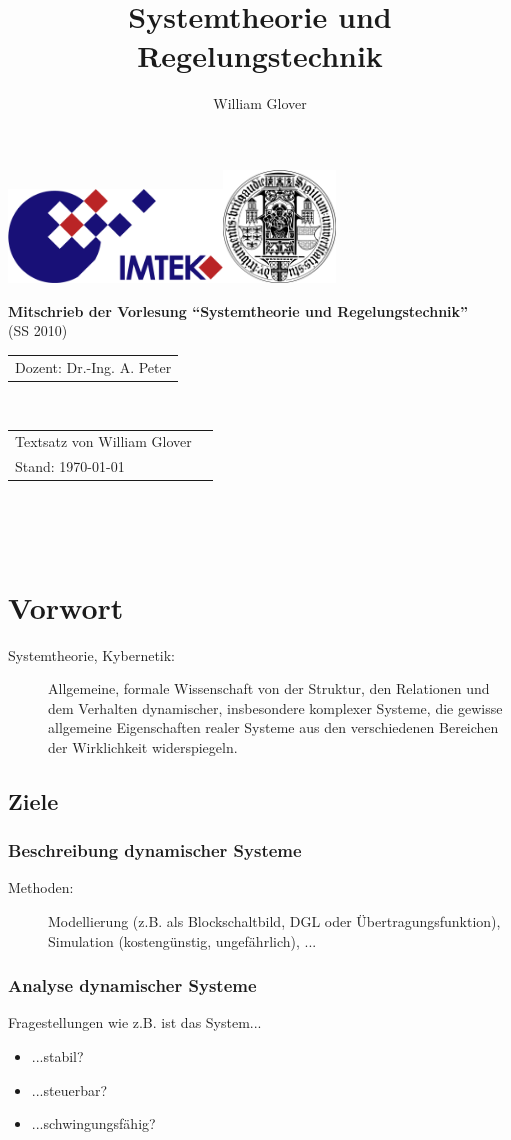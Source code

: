 \documentclass[12pt,a4paper,ngerman]{scrartcl}
\author{William Glover}
\title{Systemtheorie und Regelungstechnik}
\renewcommand\maketitle{
    \begin{titlepage}
        \sffamily
        \thispagestyle{empty}
              \includegraphics[height=2.5cm]{IMTEK_Logo_Farbe}\hfill\includegraphics[height=3cm]{Uni_Siegel}
        \par
        \vspace{2cm}
        \begin{center}
            \Huge \textbf{Mitschrieb der Vorlesung ``Systemtheorie und Regelungstechnik''}\\
            (SS 2010)\\[6cm]
            \end{center}
           

            \begin{tabular}{l}
                \large Dozent: Dr.-Ing. A. Peter\\
         \end{tabular}
         \\
						\begin{tabular}{ll}
                \large Textsatz von William Glover \\
                \large Stand: \today
            \end{tabular}
        
        

 			 \newpage 
       \thispagestyle{empty}~
       \newpage

 
\end{titlepage}
}
\renewcommand{\baselinestretch}{1.5} %
\begin{document}
\maketitle %
\clearpage %
\renewcommand{\baselinestretch}{1.5} %
\thispagestyle{empty} %

\tableofcontents %
\newpage 

        
        \thispagestyle{empty}~
        \newpage
     

\setcounter{page}{2} %


\addtocounter{section}{-1}%
\section{Vorwort}

\begin{description}
\item[Systemtheorie, Kybernetik:] Allgemeine, formale Wissenschaft von der Struktur, den Relationen und dem Verhalten dynamischer, insbesondere komplexer Systeme, die gewisse allgemeine Eigenschaften realer Systeme aus den verschiedenen Bereichen der Wirklichkeit widerspiegeln. 
\end{description}

\subsection*{Ziele}

\subsubsection*{Beschreibung dynamischer Systeme}
\begin{description}
\item[Methoden:] Modellierung (z.B. als Blockschaltbild, DGL oder Übertragungsfunktion), Simulation (kostengünstig, ungefährlich), ...
\end{description}

\subsubsection*{Analyse dynamischer Systeme}
Fragestellungen wie z.B. ist das System...
\begin{itemize}
\item ...stabil?
\item ...steuerbar?
\item ...schwingungsfähig?
\end{itemize}
\end{document}
